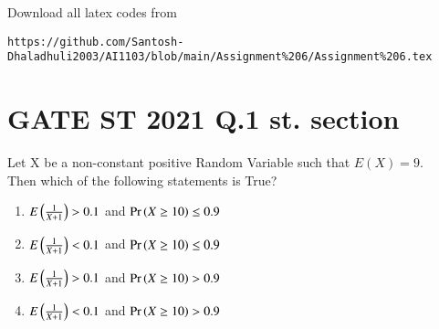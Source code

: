 \documentclass[journal,12pt,twocolumn]{IEEEtran}
\begin{document}
Download all latex codes from 
\begin{lstlisting}
https://github.com/Santosh-Dhaladhuli2003/AI1103/blob/main/Assignment%206/Assignment%206.tex
\end{lstlisting}
\section{\textbf{GATE ST 2021 Q.1 st. section}}
Let X be a non-constant positive Random Variable such that $E(X) = 9$.\\
Then which of the following statements is True?

\begin{enumerate}
\item  $E\left(\frac{1}{X+1}\right) > 0.1$ and $\Pr\left(X \ge 10\right) \le 0.9$
\item   $E\left(\frac{1}{X+1}\right) < 0.1$ and $\Pr\left(X \ge 10\right) \le 0.9$
\item   $E\left(\frac{1}{X+1}\right) > 0.1$ and $\Pr\left(X \ge 10\right) > 0.9$
\item   $E\left(\frac{1}{X+1}\right) < 0.1$ and $\Pr\left(X \ge 10\right) > 0.9$
\end{enumerate}
\end{document}
